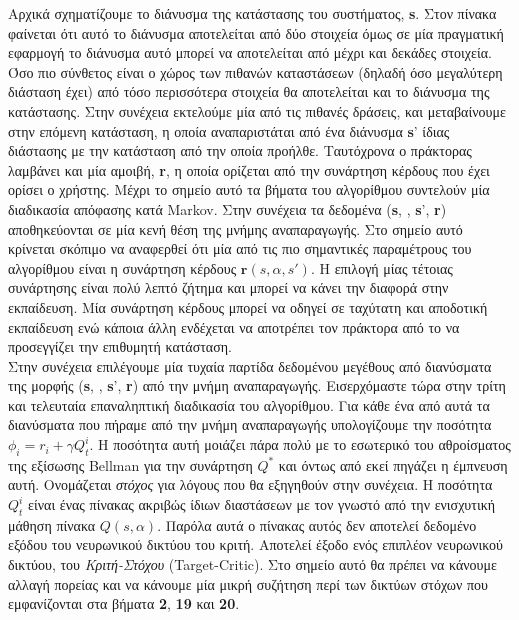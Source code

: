 \documentclass[11pt]{article} %
\numberwithin{equation}{subsection}
\begin{document}
Αρχικά σχηματίζουμε το διάνυσμα της κατάστασης του συστήματος, \textbf{s}. Στον πίνακα φαίνεται ότι αυτό το διάνυσμα αποτελείται από δύο στοιχεία όμως σε μία πραγματική εφαρμογή το διάνυσμα αυτό μπορεί να αποτελείται από μέχρι και δεκάδες στοιχεία. Όσο πιο σύνθετος είναι ο χώρος των πιθανών καταστάσεων (δηλαδή όσο μεγαλύτερη διάσταση έχει) από τόσο περισσότερα στοιχεία θα αποτελείται και το διάνυσμα της κατάστασης. Στην συνέχεια εκτελούμε μία από τις πιθανές δράσεις, \textbf{\alpha} και μεταβαίνουμε στην επόμενη κατάσταση, η οποία αναπαριστάται από ένα διάνυσμα \textbf{s}' ίδιας διάστασης με την κατάσταση από την οποία προήλθε. Ταυτόχρονα ο πράκτορας λαμβάνει και μία αμοιβή, \textbf{r}, η οποία ορίζεται από την συνάρτηση κέρδους που έχει ορίσει ο χρήστης. Μέχρι το σημείο αυτό τα βήματα του αλγορίθμου συντελούν μία διαδικασία απόφασης κατά Markov. Στην συνέχεια τα δεδομένα (\textbf{s}, \textbf{\alpha}, \textbf{s}', \textbf{r}) αποθηκεύονται σε μία κενή θέση της μνήμης αναπαραγωγής. Στο σημείο αυτό κρίνεται σκόπιμο να αναφερθεί ότι μία από τις πιο σημαντικές παραμέτρους του αλγορίθμου είναι η συνάρτηση κέρδους $\textbf{r}(s, \alpha, s')$. Η επιλογή μίας τέτοιας συνάρτησης είναι πολύ λεπτό ζήτημα και μπορεί να κάνει την διαφορά στην εκπαίδευση. Μία συνάρτηση κέρδους μπορεί να οδηγεί σε ταχύτατη και αποδοτική εκπαίδευση ενώ κάποια άλλη ενδέχεται να αποτρέπει τον πράκτορα από το να προσεγγίζει την επιθυμητή κατάσταση.\\

Στην συνέχεια επιλέγουμε μία τυχαία παρτίδα δεδομένου μεγέθους από διανύσματα της μορφής (\textbf{s}, \textbf{\alpha}, \textbf{s}', \textbf{r}) από την μνήμη αναπαραγωγής. Εισερχόμαστε τώρα στην τρίτη και τελευταία επαναληπτική διαδικασία του αλγορίθμου. Για κάθε ένα από αυτά τα διανύσματα που πήραμε από την μνήμη αναπαραγωγής υπολογίζουμε την ποσότητα $\phi_{i} = r_{i} + \gamma Q^{i}_{t}$. Η ποσότητα αυτή μοιάζει πάρα πολύ με το εσωτερικό του αθροίσματος της εξίσωσης Bellman για την συνάρτηση $Q^{*}$ και όντως από εκεί πηγάζει η έμπνευση αυτή. Ονομάζεται \textit{στόχος} για λόγους που θα εξηγηθούν στην συνέχεια. Η ποσότητα $ Q^{i}_{t}$ είναι ένας πίνακας ακριβώς ίδιων διαστάσεων με τον γνωστό από την ενισχυτική μάθηση πίνακα $Q(s,\alpha)$. Παρόλα αυτά ο πίνακας αυτός δεν αποτελεί δεδομένο εξόδου του νευρωνικού δικτύου του κριτή. Αποτελεί έξοδο ενός επιπλέον νευρωνικού δικτύου, του \textit{Κριτή-Στόχου} (Target-Critic). Στο σημείο αυτό θα πρέπει να κάνουμε αλλαγή πορείας και να κάνουμε μία μικρή συζήτηση περί των δικτύων στόχων \cite{deepmind} που εμφανίζονται στα βήματα \textbf{2}, \textbf{19} και \textbf{20}.\\
\end{document}
